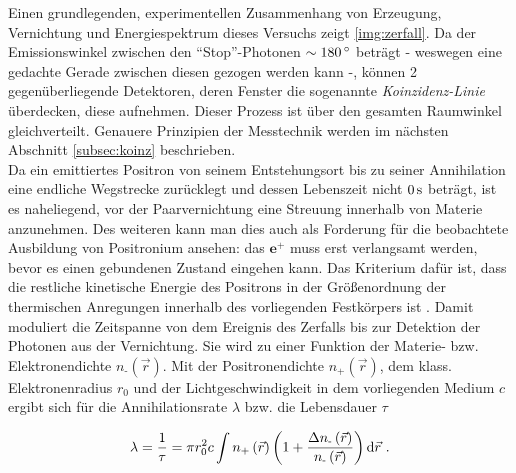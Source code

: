 \documentclass[numbers=noenddot,a4paper,notitlepage,twoside]{scrartcl}
\newcommand{\degree}{^\circ}
\newcommand{\diff}{\textnormal{d}}
\newcommand{\ix}[1]{_\text{#1}}
\newcommand{\tilt}[1]{\textit{#1}}
\begin{document}
			Einen grundlegenden, experimentellen Zusammenhang von Erzeugung, Vernichtung und Energiespektrum dieses Versuchs zeigt \ref{img:zerfall}. Da der Emissionswinkel zwischen den "`Stop"'-Photonen $\sim\unit[180]{\degree}$ beträgt - weswegen eine gedachte Gerade zwischen diesen gezogen werden kann -, können 2 gegenüberliegende Detektoren, deren Fenster die sogenannte \tilt{Koinzidenz-Linie} überdecken, diese aufnehmen. Dieser Prozess ist über den gesamten Raumwinkel gleichverteilt. Genauere Prinzipien der Messtechnik werden im nächsten Abschnitt \ref{subsec:koinz} beschrieben.\\
			Da ein emittiertes Positron von seinem Entstehungsort bis zu seiner Annihilation eine endliche Wegstrecke zurücklegt und dessen Lebenszeit nicht $\unit[0]{s}$ beträgt, ist es naheliegend, vor der Paarvernichtung eine Streuung innerhalb von Materie anzunehmen. Des weiteren kann man dies auch als Forderung für die beobachtete Ausbildung von Positronium ansehen: das $\textbf{e}^+$ muss erst verlangsamt werden, bevor es einen gebundenen Zustand eingehen kann. Das Kriterium dafür ist, dass die restliche kinetische Energie des Positrons in der Größenordnung der thermischen Anregungen innerhalb des vorliegenden Festkörpers ist \cite{Augsten08}. Damit moduliert die Zeitspanne von dem Ereignis des Zerfalls bis zur Detektion der Photonen aus der Vernichtung. Sie wird zu einer Funktion der Materie- bzw. Elektronendichte $n\ix{-}\left(\vec{r}\right)$. Mit der Positronendichte $n\ix{+}\left(\vec{r}\right)$, dem klass. Elektronenradius $r\ix{0}$ und der Lichtgeschwindigkeit in dem vorliegenden Medium $c$ ergibt sich für die Annihilationsrate $\lambda$ bzw. die Lebensdauer $\tau$

				\begin{align}
					\lambda=\frac{1}{\tau}=\pi r\ix{0}^{2}c\int n\ix{+}\left(\vec{r}\right)\left(1+\frac{\Delta n\ix{-}\left(\vec{r}\right)}{n\ix{-}\left(\vec{r}\right)}\right)\diff \vec{r} \,\, .
				\end{align}
\end{document}
